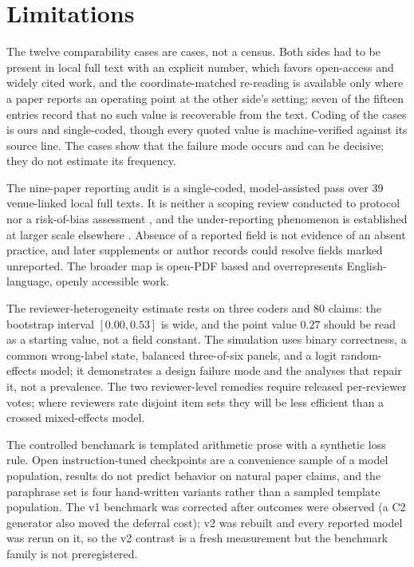 \documentclass[11pt]{article}
\begin{document}
\section*{Limitations}

The twelve comparability cases are cases, not a census. Both sides had to be
present in local full text with an explicit number, which favors open-access
and widely cited work, and the coordinate-matched re-reading is available only
where a paper reports an operating point at the other side's setting; seven of
the fifteen entries record that no such value is recoverable from the text.
Coding of the cases is ours and single-coded, though every quoted value is
machine-verified against its source line. The cases show that the failure mode
occurs and can be decisive; they do not estimate its frequency.

The nine-paper reporting audit is a single-coded, model-assisted pass over 39
venue-linked local full texts. It is neither a scoping review conducted to
protocol \citep{prismaScR2018} nor a risk-of-bias assessment
\citep{whiting2011quadas}, and
the under-reporting phenomenon is established at larger scale elsewhere
\citep{howcroft2020twenty,vanderlee2021human}. Absence of a reported field is
not evidence of an absent practice, and later supplements or author records
could resolve fields marked unreported. The broader map is open-PDF based and
overrepresents English-language, openly accessible work.

The reviewer-heterogeneity estimate rests on three coders and 80 claims: the
bootstrap interval $[0.00, 0.53]$ is wide, and the point value $0.27$ should
be read as a starting value, not a field constant. The simulation uses binary
correctness, a common wrong-label state, balanced three-of-six panels, and a
logit random-effects model; it demonstrates a design failure mode and the
analyses that repair it, not a prevalence. The two reviewer-level remedies
require released per-reviewer votes; where reviewers rate disjoint item sets
they will be less efficient than a crossed mixed-effects model.

The controlled benchmark is templated arithmetic prose with a synthetic loss
rule. Open instruction-tuned checkpoints are a convenience sample of a model
population, results do not predict behavior on natural paper claims, and the
paraphrase set is four hand-written variants rather than a sampled template
population. The v1 benchmark was corrected after outcomes were observed
(a C2 generator also moved the deferral cost); v2 was rebuilt and every
reported model was rerun on it, so the v2 contrast is a fresh measurement but
the benchmark family is not preregistered.
\end{document}
